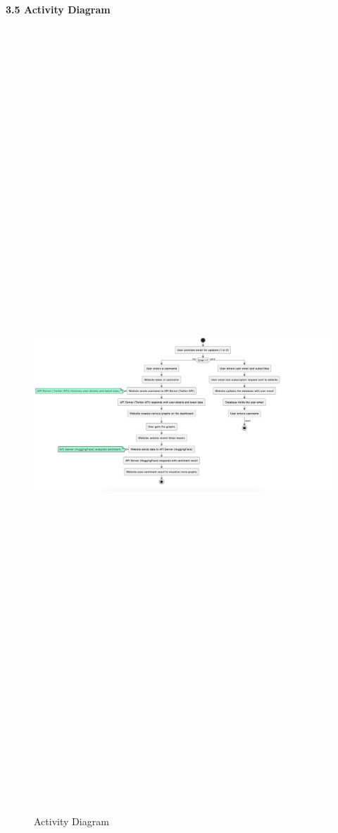 \documentclass[a4paper,12pt]{article}
\begin{document}
{{{\newpage
  
		\begin{flushleft}
			\fontsize{13}{15}\selectfont\textbf{3.5 Activity Diagram}
			\label{activity}
		\end{flushleft}
								
		\begin{figure}[htbp]
			\centering
			\includegraphics[width=7in, height=15in, keepaspectratio]{activityDiagram.png}
			\label{activitydiagram}
			\caption{Activity Diagram}
		\end{figure}

}}}
\end{document}
